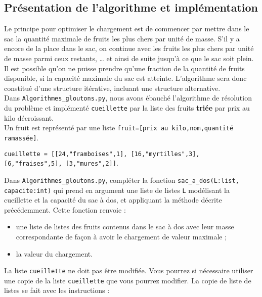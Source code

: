 \subsection*{Présentation de l’algorithme et implémentation}
\label{sec:PrésentationDeLAlgorithmeEtImplémentation}

Le principe pour optimiser le chargement est de commencer par mettre dans le sac la quantité maximale de fruits les plus chers par unité de masse. S'il y a encore de la place dans le sac, on continue avec les fruits les plus chers par unité de masse parmi ceux restants, … et ainsi de suite jusqu'à ce que le sac soit plein.\\
Il est possible qu'on ne puisse prendre qu'une fraction de la quantité de fruits disponible, si la capacité maximale du sac est atteinte. L'algorithme sera donc constitué d'une structure itérative, incluant une structure alternative.\\

Dans \lstinline{Algorithmes_gloutons.py}, nous avons ébauché l'algorithme de résolution du problème et implémenté \lstinline{cueillette} par la liste des fruits \textbf{triée} par prix au kilo décroissant.\\
Un fruit est représenté par une liste \lstinline{fruit=[prix au kilo,nom,quantité ramassée]}.

\lstinline{cueillette = [[24,"framboises",1], [16,"myrtilles",3], [6,"fraises",5], [3,"mures",2]]}.

\begin{question}
Dans \lstinline{Algorithmes_gloutons.py}, compléter la fonction \lstinline{sac_a_dos(L:list, capacite:int)} qui prend en argument une liste de listes \lstinline{L} modélisant la cueillette et la capacité du sac à dos, et appliquant la méthode décrite précédemment. Cette fonction renvoie :
\begin{itemize}
\item une liste de listes des fruits contenus dans le sac à dos avec leur masse correspondante de façon à avoir le chargement de valeur maximale ;
\item la valeur du chargement.
\end{itemize}
\end{question}

La liste \lstinline{cueillette} ne doit pas être modifiée. Vous pourrez si nécessaire utiliser une copie de la liste  \lstinline{cueillette} que vous pourrez modifier. La copie de liste de listes se fait avec les instructions :

